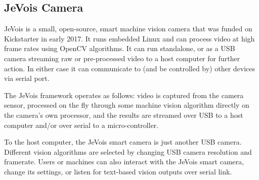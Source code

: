 \subsection{JeVois Camera}
JeVois is a small, open-source, smart machine vision camera that was funded on Kickstarter in early 2017. It runs embedded Linux and can process video at high frame rates using OpenCV algorithms. It can run standalone, or as a USB camera streaming raw or pre-processed video to a host computer for further action. In either case it can communicate to (and be controlled by) other devices via serial port.

The JeVois framework operates as follows: video is captured from the camera sensor, processed on the fly through some machine vision algorithm directly on the camera's own processor, and the results are streamed over USB to a host computer and/or over serial to a micro-controller.

To the host computer, the JeVois smart camera is just another USB camera. Different vision algorithms are selected by changing USB camera resolution and framerate. Users or machines can also interact with the JeVois smart camera, change its settings, or listen for text-based vision outputs over serial link.\cite{JeVois}
